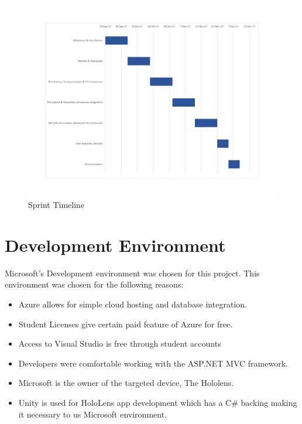 \begin{figure}[H]
\begin{center}
\includegraphics[width=1\textwidth]{./SprintGanattChart}
\end{center}
\caption{Sprint Timeline}
\end{figure}

\section{Development Environment}
Microsoft's Development environment was chosen for this project. This environment
was chosen for the following reasons:

\begin{itemize}
    \item Azure allows for simple cloud hosting and database integration.

    \item Student Licenses give certain paid feature of Azure for free.
    
    \item Access to Visual Studio is free through student accounts

    \item Developers were comfortable working with the ASP.NET MVC framework.

    \item Microsoft is the owner of the targeted device, The Hololens.

    \item Unity is used for HoloLens app development which has a C\# backing making it necessary to us Microsoft environment.

\end{itemize}

